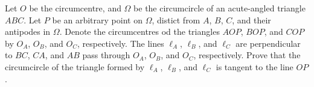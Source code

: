 Let $O$ be the circumcentre, and $\Omega$ be the circumcircle of an acute-angled triangle $ABC$.
Let $P$ be an arbitrary point on $\Omega$, distict from $A$, $B$, $C$, and their antipodes in $\Omega$.
Denote the circumcentres od the triangles $AOP$, $BOP$, and $COP$ by $O_A$, $O_B$, and $O_C$, respectively.
The lines $\ell_A$, $\ell_B$, and $\ell_C$ are perpendicular to $BC$, $CA$, and $AB$ pass through $O_A$, $O_B$, and $O_C$, respectively.
Prove that the circumcircle of the triangle formed by $\ell_A$, $\ell_B$, and $\ell_C$ is tangent to the line $OP$.
